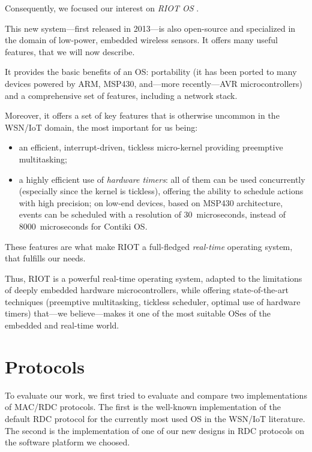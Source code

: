 \documentclass[12pt,a4paper]{article}
\begin{document}
\bigskip

Consequently, we focused our interest on \emph{RIOT OS} \cite{RIOT}.

This new system---first released in 2013---is also open-source and
specialized in the domain of low-power, embedded wireless sensors.
It offers many useful features, that we will now describe.

It provides the basic benefits of an OS: portability (it has been ported
to many devices powered by ARM, MSP430, and---more recently---AVR
microcontrollers) and a comprehensive set of features, including
a network stack.

\begin{observ}
Moreover, it offers a set of key features that is otherwise uncommon in
the WSN/IoT domain, the most important for us being:
\begin{itemize}
\item an efficient, interrupt-driven, tickless micro-kernel providing
      preemptive multitasking;
\item a highly efficient use of \emph{hardware timers}: all of them can be
      used concurrently (especially since the kernel is tickless), offering
      the ability to schedule actions with high precision; on low-end
      devices, based on MSP430 architecture, events can be scheduled
      with a resolution of 30~microseconds, instead of 8000~microseconds
      for Contiki OS.
\end{itemize}
These features are what make RIOT a full-fledged \emph{real-time} operating
system, that fulfills our needs.
\end{observ}

Thus, RIOT is a powerful real-time operating system, adapted to the
limitations of deeply embedded hardware microcontrollers, while offering
state-of-the-art techniques (preemptive multitasking, tickless scheduler,
optimal use of hardware timers) that---we believe---makes it one of
the most suitable OSes of the embedded and real-time world.



\section{Protocols}
\label{SectProtoDescription}

To evaluate our work, we first tried to evaluate and compare two
implementations of MAC/RDC protocols. The first is the well-known
implementation of the default RDC protocol for the currently most used OS
in the WSN/IoT literature. The second is the implementation of one of our
new designs in RDC protocols on the software platform we choosed.
\end{document}
